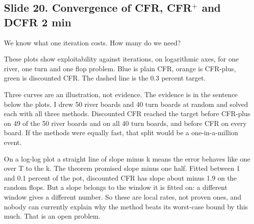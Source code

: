 \documentclass[11pt]{article}
\newcommand{\slidehead}[3]{\subsection*{Slide #1. #2 \hfill {\normalfont\small #3}}}
\begin{document}
\slidehead{20}{Convergence of CFR, CFR$^+$ and DCFR}{2 min}
\begin{say}
We know what one iteration costs. How many do we need?

These plots show exploitability against iterations, on logarithmic axes, for one river, one turn and one flop
problem. Blue is plain CFR, orange is CFR-plus, green is discounted CFR. The dashed line is the 0.3 percent target.

Three curves are an illustration, not evidence. The evidence is in the sentence below the plots. I drew 50 river
boards and 40 turn boards at random and solved each with all three methods. Discounted CFR reached the target before
CFR-plus on 49 of the 50 river boards and on all 40 turn boards, and before CFR on every board. If the methods were
equally fast, that split would be a one-in-a-million event.

On a log-log plot a straight line of slope minus k means the error behaves like one over T to the k. The theorem
promised slope minus one half. Fitted between 1 and 0.1 percent of the pot, discounted CFR has slope about minus 1.9
on the random flops. But a slope belongs to the window it is fitted on: a different window gives a different number.
So these are local rates, not proven ones, and nobody can currently explain why the method beats its worst-case
bound by this much. That is an open problem.
\end{say}
\end{document}
